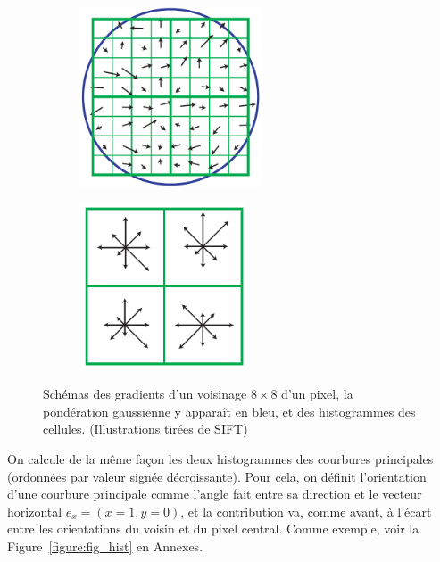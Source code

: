 \documentclass[
	a4paper, %
	10pt, %
	unnumberedsections, %
	twoside, %
]{LTJournalArticle}
\begin{document}
\begin{figure}[H]
	\centering
	\begin{subfigure}[H]{\columnwidth}
		\centering
		\includegraphics[width=0.6\textwidth]{images/lowe_grads.png}
	\end{subfigure}
	\begin{subfigure}[H]{\columnwidth}
		\centering
		\includegraphics[width=0.55\textwidth]{images/lowe_desc.png}
	\end{subfigure}
	\caption{Schémas des gradients d'un voisinage $8 \times 8$ d'un pixel, la pondération
		gaussienne y apparaît en bleu, et des histogrammes des cellules. (Illustrations tirées
		de SIFT) }
	\label{figure:lowe_desc_constr}
\end{figure}

On calcule de la même façon les deux histogrammes des courbures principales
(ordonnées par valeur signée décroissante). Pour cela,
on définit l'orientation d'une courbure principale comme l'angle fait entre sa
direction et le vecteur horizontal $e_x=(x=1, y=0)$, et la contribution va,
comme avant, à l'écart entre les orientations du voisin et du pixel central.
Comme exemple, voir la Figure~\ref{figure:fig_hist} en Annexes.
\end{document}
